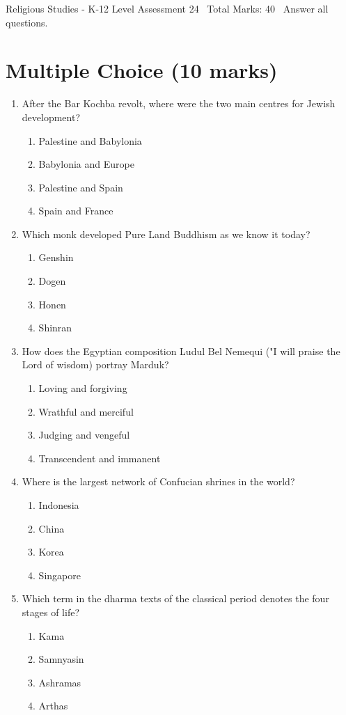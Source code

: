 \documentclass[12pt]{article}
\begin{document}
\begin{center}
Religious Studies - K-12 Level Assessment 24 \
Total Marks: 40 \
Answer all questions.
\end{center}

\section*{Multiple Choice (10 marks)}
\begin{enumerate}[label=\arabic*.]
\item After the Bar Kochba revolt, where were the two main centres for Jewish development?
\begin{enumerate}[label=(\alph*)]
    \item Palestine and Babylonia
    \item Babylonia and Europe
    \item Palestine and Spain
    \item Spain and France
\end{enumerate}
\item Which monk developed Pure Land Buddhism as we know it today?
\begin{enumerate}[label=(\alph*)]
    \item Genshin
    \item Dogen
    \item Honen
    \item Shinran
\end{enumerate}
\item How does the Egyptian composition Ludul Bel Nemequi ("I will praise the Lord of wisdom) portray Marduk?
\begin{enumerate}[label=(\alph*)]
    \item Loving and forgiving
    \item Wrathful and merciful
    \item Judging and vengeful
    \item Transcendent and immanent
\end{enumerate}
\item Where is the largest network of Confucian shrines in the world?
\begin{enumerate}[label=(\alph*)]
    \item Indonesia
    \item China
    \item Korea
    \item Singapore
\end{enumerate}
\item Which term in the dharma texts of the classical period denotes the four stages of life?
\begin{enumerate}[label=(\alph*)]
    \item Kama
    \item Samnyasin
    \item Ashramas
    \item Arthas
\end{enumerate}
\end{enumerate}
\end{document}
